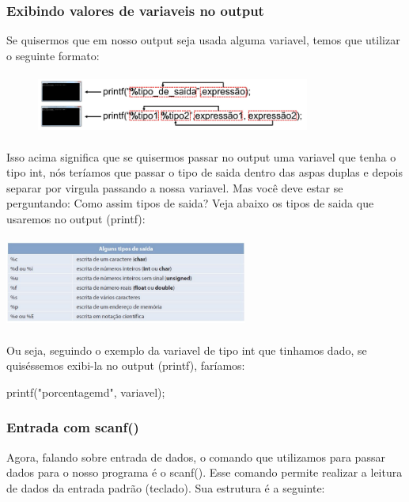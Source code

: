 \documentclass{report}
\begin{document}
	\subsubsection{Exibindo valores de variaveis no output}
	Se quisermos que em nosso output seja usada alguma variavel, temos que utilizar o seguinte formato:
	
	\begin{figure}[ht]
		\centering
		\includegraphics[width=9cm,height=2cm,keepaspectratio=false]{imagens/tipo_saida.png}
	\end{figure}
	
	Isso acima significa que se quisermos passar no output uma variavel que tenha o tipo int, nós teríamos que passar o tipo de saida  dentro das aspas duplas e depois separar por virgula passando a nossa variavel. Mas você deve estar se perguntando: Como assim tipos de saida? Veja abaixo os tipos de saida que usaremos no output (printf):
	
	\begin{center}

		\includegraphics[width=8cm,height=3cm,keepaspectratio=false]{imagens/comando_saida.png}
	\end{center}
	
	Ou seja, seguindo o exemplo da variavel de tipo int que tinhamos dado, se quiséssemos exibi-la no output (printf), faríamos:
	
	\begin{LARGE}
		\begin{center}
			printf("porcentagemd", variavel);
		\end{center}
	\end{LARGE}
	
	\subsubsection{Entrada com scanf()}
	Agora, falando sobre entrada de dados, o comando que utilizamos para passar dados para o nosso programa é o scanf(). Esse comando permite realizar a leitura de dados da entrada padrão (teclado). Sua estrutura é a seguinte:
	
\end{document}
